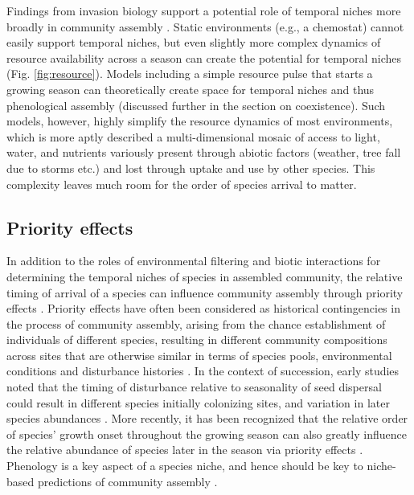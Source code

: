 \documentclass[11pt]{article}
\begin{document}
Findings from invasion biology support a potential role of temporal niches more broadly in community assembly \citep{gotelli1996}. Static environments (e.g., a chemostat) cannot easily support temporal niches, but even slightly more complex dynamics of resource availability across a season can create the potential for temporal niches (Fig. \ref{fig:resource}). Models including a simple resource pulse that starts a growing season can theoretically create space for temporal niches and thus phenological assembly (discussed further in the section on coexistence). Such models, however, highly simplify the resource dynamics of most environments, which is more aptly described a multi-dimensional mosaic of access to light, water, and nutrients variously present through abiotic factors (weather, tree fall due to storms etc.) and lost through uptake and use by other species. This complexity leaves much room for the order of species arrival to matter.

\subsection*{Priority effects}

In addition to the roles of environmental filtering and biotic interactions for determining the temporal niches of species in assembled community, the relative timing of arrival of a species can influence community assembly through priority effects \citep{alford1985priority,chase2003community,fukami2015historical}. Priority effects have often been considered as historical contingencies in the process of community assembly, arising from the chance establishment of individuals of different species, resulting in different community compositions across sites that are otherwise similar in terms of species pools, environmental conditions and disturbance histories \citep[e.g.][]{diamond1975assembly}. In the context of succession, early studies noted that the timing of disturbance relative to seasonality of seed dispersal could result in different species initially colonizing sites, and variation in later species abundances \citep{keever1950causes,holt1972effect}. More recently, it has been recognized that the relative order of species’ growth onset throughout the growing season can also greatly influence the relative abundance of species later in the season via priority effects \citep{fukami2015historical,wainwright2012seasonal,rudolf2019role}.  Phenology is a key aspect of a species niche, and hence should be key to niche-based predictions of community assembly \citep{vannette2014historical}.
\end{document}
